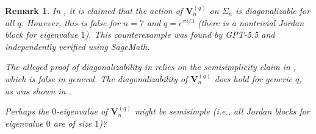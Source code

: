 \documentclass[revision]{FPSAC2025}
\newtheorem{remark}{Remark}
\begin{document}
\begin{remark}
In \cite{CalderbankHanlonSundaram94}, it is claimed that the action of $\mathbf{V}_n^{(q)}$ on $\Sigma_n$ is diagonalizable for all $q$.
However, this is false for $n = 7$ and $q = e^{\pi i/3}$ (there is a nontrivial Jordan block for eigenvalue $1$).
This counterexample was found by GPT-5.5 and independently verified using SageMath.

The alleged proof of diagonalizability in \cite{CalderbankHanlonSundaram94} relies on the semisimplicity claim in \cite[Corollary 2.3]{CalderbankHanlonSundaram94}, which is false in general.
The diagonalizability of $\mathbf{V}_n^{(q)}$ does hold for generic $q$, as was shown in \cite[Theorem 5.14]{NCSF2}.

Perhaps the $0$-eigenvalue of $\mathbf{V}_n^{(q)}$ might be semisimple (i.e., all Jordan blocks for eigenvalue $0$ are of size $1$)?
\end{remark}






\end{document}
